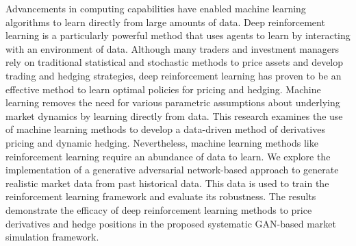 % 
% 
%
Advancements in computing capabilities have enabled machine learning algorithms to learn directly from large amounts of data. Deep reinforcement learning is a particularly powerful method that uses agents to learn by interacting with an environment of data. Although many traders and investment managers rely on traditional statistical and stochastic methods to price assets and develop trading and hedging strategies, deep reinforcement learning has proven to be an effective method to learn optimal policies for pricing and hedging. Machine learning removes the need for various parametric assumptions about underlying market dynamics by learning directly from data. This research examines the use of machine learning methods to develop a data-driven method of derivatives pricing and dynamic hedging. Nevertheless, machine learning methods like reinforcement learning require an abundance of data to learn. We explore the implementation of a generative adversarial network-based approach to generate realistic market data from past historical data. This data is used to train the reinforcement learning framework and evaluate its robustness. The results demonstrate the efficacy of deep reinforcement learning methods to price derivatives and hedge positions in the proposed systematic GAN-based market simulation framework.